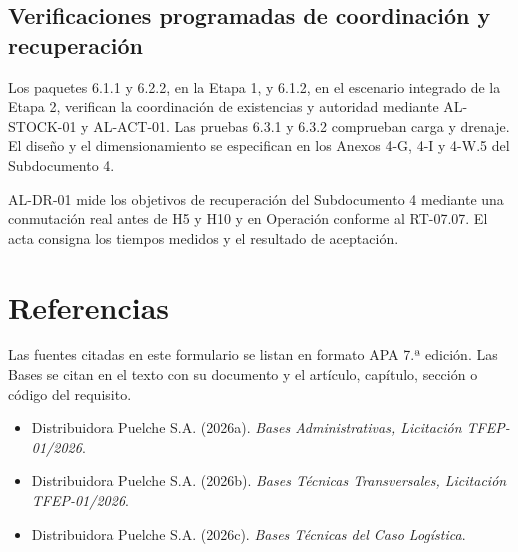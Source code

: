 \subsection{Verificaciones programadas de coordinación y recuperación}

Los paquetes 6.1.1 y 6.2.2, en la Etapa 1, y 6.1.2, en el escenario integrado de la Etapa 2, verifican la coordinación de existencias y autoridad mediante AL-STOCK-01 y AL-ACT-01. Las pruebas 6.3.1 y 6.3.2 comprueban carga y drenaje. El diseño y el dimensionamiento se especifican en los Anexos 4-G, 4-I y 4-W.5 del Subdocumento 4.

AL-DR-01 mide los objetivos de recuperación del Subdocumento 4 mediante una conmutación real antes de H5 y H10 y en Operación conforme al RT-07.07. El acta consigna los tiempos medidos y el resultado de aceptación.

\section*{Referencias}
{}

Las fuentes citadas en este formulario se listan en formato APA 7.ª edición. Las Bases se citan en el texto con su documento y el artículo, capítulo, sección o código del requisito.

\begin{itemize}
\item Distribuidora Puelche S.A. (2026a). \emph{Bases Administrativas, Licitación TFEP-01/2026}.
\item Distribuidora Puelche S.A. (2026b). \emph{Bases Técnicas Transversales, Licitación TFEP-01/2026}.
\item Distribuidora Puelche S.A. (2026c). \emph{Bases Técnicas del Caso Logística}.

\end{itemize}

